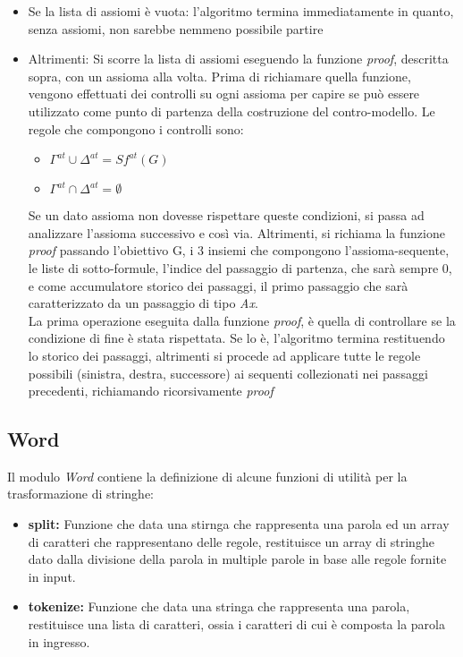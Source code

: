 \documentclass[\main/tesi.tex]{subfiles}
\begin{document}
\begin{itemize}
    \item Se la lista di assiomi è vuota: l'algoritmo termina immediatamente in quanto, senza assiomi, non sarebbe nemmeno possibile partire
    \item Altrimenti: Si scorre la lista di assiomi eseguendo la funzione \textit{proof}, descritta sopra, con un assioma alla volta. Prima di richiamare quella funzione, vengono effettuati dei controlli su ogni assioma per capire se può essere utilizzato come punto di partenza della costruzione del contro-modello. Le regole che compongono i controlli sono:
          \begin{itemize}
              \item $\Gamma^{at} \cup \Delta^{at} = Sf^{at}(G)$
              \item $\Gamma^{at} \cap \Delta^{at} = \emptyset$
          \end{itemize}
          Se un dato assioma non dovesse rispettare queste condizioni, si passa ad analizzare l'assioma successivo e così via. Altrimenti, si richiama la funzione \textit{proof} passando l'obiettivo G, i 3 insiemi che compongono l'assioma-sequente, le liste di sotto-formule, l'indice del passaggio di partenza, che sarà sempre 0, e come accumulatore storico dei passaggi, il primo passaggio che sarà caratterizzato da un passaggio di tipo \textit{Ax}. \\
          La prima operazione eseguita dalla funzione \textit{proof}, è quella di controllare se la condizione di fine è stata rispettata. Se lo è, l'algoritmo termina restituendo lo storico dei passaggi, altrimenti si procede ad applicare tutte le regole possibili (sinistra, destra, successore) ai sequenti collezionati nei passaggi precedenti, richiamando ricorsivamente \textit{proof}
\end{itemize}

\subsection{Word}
Il modulo \textit{Word} contiene la definizione di alcune funzioni di utilità per la trasformazione di stringhe:
\begin{itemize}
    \item \textbf{split:} Funzione che data una stirnga che rappresenta una parola ed un array di caratteri che rappresentano delle regole, restituisce un array di stringhe dato dalla divisione della parola in multiple parole in base alle regole fornite in input.
    \item \textbf{tokenize:} Funzione che data una stringa che rappresenta una parola, restituisce una lista di caratteri, ossia i caratteri di cui è composta la parola in ingresso.
\end{itemize}
\end{document}
